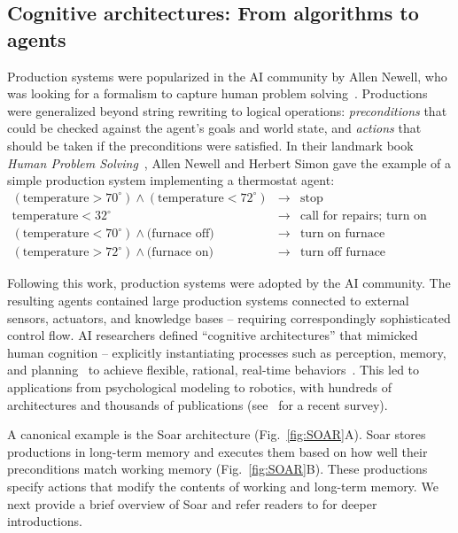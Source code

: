 \documentclass[10pt]{article} %
\begin{document}
\subsection{Cognitive architectures: From algorithms to agents}
\label{sec:soar}

Production systems were popularized in the AI community by Allen Newell, who was looking for a formalism to capture human problem solving~\citep{newell1967studies, newell1972human}. Productions were generalized beyond string rewriting to logical operations: \emph{preconditions} that could be checked against the agent's goals and world state, and \emph{actions} that should be taken if the preconditions were satisfied. In their landmark book {\em Human Problem Solving}~\citep{newell1972human}, Allen Newell and Herbert Simon gave the example of a simple production system implementing a thermostat agent:
\begin{eqnarray*}
(\mbox{temperature} > 70^{\circ})\wedge (\mbox{temperature} < 72^{\circ}) &\rightarrow& \mbox{stop}\\
\mbox{temperature} < 32^{\circ} &\rightarrow& \mbox{call for repairs; turn on electric heater} \\
(\mbox{temperature} < 70^{\circ}) \wedge \mbox{(furnace off)} &\rightarrow& \mbox{turn on furnace}\\
(\mbox{temperature} > 72^{\circ}) \wedge \mbox{(furnace on)} &\rightarrow& \mbox{turn off furnace}
\end{eqnarray*}

Following this work, production systems were adopted by the AI community.
The resulting agents contained large production systems connected to external sensors, actuators, and knowledge bases -- requiring correspondingly sophisticated control flow. AI researchers defined ``cognitive architectures'' that mimicked human cognition -- explicitly instantiating processes such as perception, memory, and planning~\citep{adams2012mapping} to achieve flexible, rational, real-time behaviors~\citep{sun2004desiderata, newell1980physical, newell1992precis, anderson2003newell}. This led to applications from psychological modeling to robotics, with hundreds of architectures and thousands of publications (see~\cite{kotseruba202040} for a recent survey).

A canonical example is the Soar architecture (Fig.~\ref{fig:SOAR}A). Soar stores productions in long-term memory and executes them based on how well their preconditions match working memory (Fig.~\ref{fig:SOAR}B). These productions specify actions that modify the contents of working and long-term memory. We next provide a brief overview of Soar and refer readers to \citet{laird2022, laird2019soar} for deeper introductions.
\end{document}
